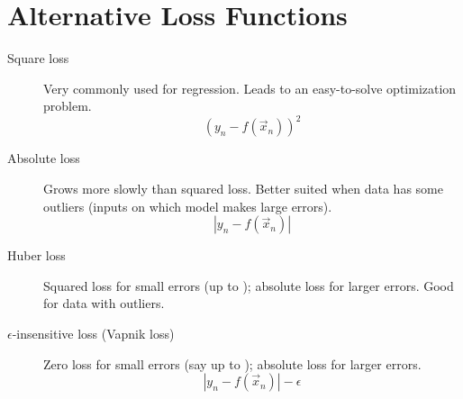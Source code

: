 \documentclass[
	exam={Midterm}
]{cs584exam}
\begin{document}
\section{Alternative Loss Functions}\label{sec:alternative-loss-functions}
\begin{description}
	\item[Square loss] Very commonly used for regression. Leads to an easy-to-solve optimization problem.
	\begin{equation}
		\left( y_{n} - f(\vec{x}_{n}) \right)^{2}
		\label{eq:quared-loss}
	\end{equation}
	\item[Absolute loss] Grows more slowly than squared loss. Better suited when data has some outliers (inputs on which model makes large errors).
	\begin{equation}
		| y_{n} - f(\vec{x}_{n}) |
		\label{eq:absolute-loss}
	\end{equation}
	\item[Huber loss] Squared loss for small errors (up to \data{$\delta$}); absolute loss for larger errors. Good for data with outliers. %
	\item[$\epsilon$-insensitive loss (Vapnik loss)] Zero loss for small errors (say up to \data{$\epsilon$}); absolute loss for larger errors.
	\begin{equation}
		| y_{n} - f(\vec{x}_{n}) | - \epsilon
		\label{eq:loss}
	\end{equation}
\end{description}

\end{document}
